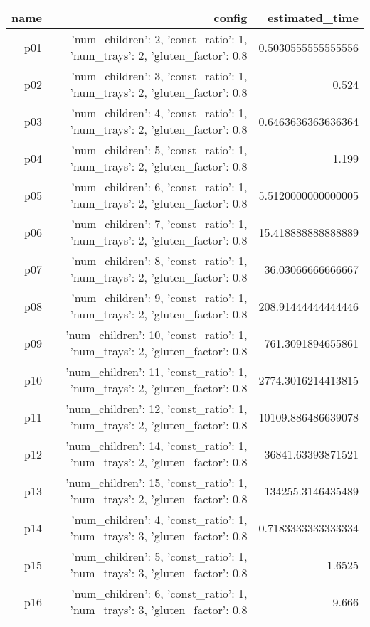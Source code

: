\documentclass{article}
\begin{document}
                            \begin{center}
                            \scriptsize
                            \begin{tabular}{r|r|r}
                            name & config & estimated\_time\\\midrule
                              p01&{'num\_children': 2, 'const\_ratio': 1, 'num\_trays': 2, 'gluten\_factor': 0.8}&0.5030555555555556\\
  p02&{'num\_children': 3, 'const\_ratio': 1, 'num\_trays': 2, 'gluten\_factor': 0.8}&0.524\\
  p03&{'num\_children': 4, 'const\_ratio': 1, 'num\_trays': 2, 'gluten\_factor': 0.8}&0.6463636363636364\\
  p04&{'num\_children': 5, 'const\_ratio': 1, 'num\_trays': 2, 'gluten\_factor': 0.8}&1.199\\
  p05&{'num\_children': 6, 'const\_ratio': 1, 'num\_trays': 2, 'gluten\_factor': 0.8}&5.5120000000000005\\
  p06&{'num\_children': 7, 'const\_ratio': 1, 'num\_trays': 2, 'gluten\_factor': 0.8}&15.418888888888889\\
  p07&{'num\_children': 8, 'const\_ratio': 1, 'num\_trays': 2, 'gluten\_factor': 0.8}&36.03066666666667\\
  p08&{'num\_children': 9, 'const\_ratio': 1, 'num\_trays': 2, 'gluten\_factor': 0.8}&208.91444444444446\\
  p09&{'num\_children': 10, 'const\_ratio': 1, 'num\_trays': 2, 'gluten\_factor': 0.8}&761.3091894655861\\
  p10&{'num\_children': 11, 'const\_ratio': 1, 'num\_trays': 2, 'gluten\_factor': 0.8}&2774.3016214413815\\
  p11&{'num\_children': 12, 'const\_ratio': 1, 'num\_trays': 2, 'gluten\_factor': 0.8}&10109.886486639078\\
  p12&{'num\_children': 14, 'const\_ratio': 1, 'num\_trays': 2, 'gluten\_factor': 0.8}&36841.63393871521\\
  p13&{'num\_children': 15, 'const\_ratio': 1, 'num\_trays': 2, 'gluten\_factor': 0.8}&134255.3146435489\\
  p14&{'num\_children': 4, 'const\_ratio': 1, 'num\_trays': 3, 'gluten\_factor': 0.8}&0.7183333333333334\\
  p15&{'num\_children': 5, 'const\_ratio': 1, 'num\_trays': 3, 'gluten\_factor': 0.8}&1.6525\\
  p16&{'num\_children': 6, 'const\_ratio': 1, 'num\_trays': 3, 'gluten\_factor': 0.8}&9.666\\

\end{tabular}
\end{center}
\end{document}
